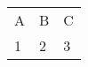 \documentclass{standalone}
\begin{document}

\setlength\tabcolsep{20pt}
\begin{tabular}{ll 
	@{\quad} %
	l}
A & B & C \\
1 & 2 & 3 \\
\end{tabular}
\end{document}
